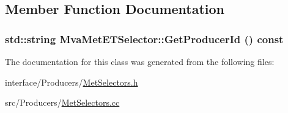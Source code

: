 \subsection{Member Function Documentation}
\hypertarget{classMvaMetETSelector_aa0bf0e0f682f9efc2e4b7bf9ae026a5a}{
\subsubsection[{GetProducerId}]{\setlength{\rightskip}{0pt plus 5cm}std::string MvaMetETSelector::GetProducerId () const}}
\label{classMvaMetETSelector_aa0bf0e0f682f9efc2e4b7bf9ae026a5a}


The documentation for this class was generated from the following files:\begin{DoxyCompactItemize}
\item 
interface/Producers/\hyperlink{MetSelectors_8h}{MetSelectors.h}\item 
src/Producers/\hyperlink{MetSelectors_8cc}{MetSelectors.cc}\end{DoxyCompactItemize}
